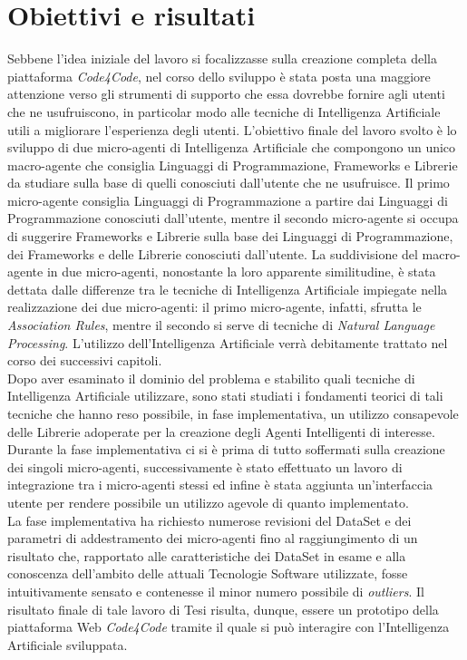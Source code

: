 \section{Obiettivi e risultati}
Sebbene l'idea iniziale del lavoro si focalizzasse sulla creazione completa della piattaforma \emph{Code4Code}, nel corso dello sviluppo è stata posta una maggiore attenzione verso gli strumenti di supporto che essa dovrebbe fornire agli utenti che ne usufruiscono, in particolar modo alle tecniche di Intelligenza Artificiale utili a migliorare l'esperienza degli utenti. L'obiettivo finale del lavoro svolto è lo sviluppo di due micro-agenti di Intelligenza Artificiale che compongono un unico macro-agente che consiglia Linguaggi di Programmazione, Frameworks e Librerie da studiare sulla base di quelli conosciuti dall'utente che ne usufruisce. Il primo micro-agente consiglia Linguaggi di Programmazione a partire dai Linguaggi di Programmazione conosciuti dall'utente, mentre il secondo micro-agente si occupa di suggerire Frameworks e Librerie sulla base dei Linguaggi di Programmazione, dei Frameworks e delle Librerie conosciuti dall'utente. La suddivisione del macro-agente in due micro-agenti, nonostante la loro apparente similitudine, è stata dettata dalle differenze tra le tecniche di Intelligenza Artificiale impiegate nella realizzazione dei due micro-agenti: il primo micro-agente, infatti, sfrutta le \emph{Association Rules}, mentre il secondo si serve di tecniche di \emph{Natural Language Processing}. L'utilizzo dell'Intelligenza Artificiale verrà debitamente trattato nel corso dei successivi capitoli.\\Dopo aver esaminato il dominio del problema e stabilito quali tecniche di Intelligenza Artificiale utilizzare, sono stati studiati i fondamenti teorici di tali tecniche che hanno reso possibile, in fase implementativa, un utilizzo consapevole delle Librerie adoperate per la creazione degli Agenti Intelligenti di interesse. Durante la fase implementativa ci si è prima di tutto soffermati sulla creazione dei singoli micro-agenti, successivamente è stato effettuato un lavoro di integrazione tra i micro-agenti stessi ed infine è stata aggiunta un'interfaccia utente per rendere possibile un utilizzo agevole di quanto implementato.\\La fase implementativa ha richiesto numerose revisioni del DataSet e dei parametri di addestramento dei micro-agenti fino al raggiungimento di un risultato che, rapportato alle caratteristiche dei DataSet in esame e alla conoscenza dell'ambito delle attuali Tecnologie Software utilizzate, fosse intuitivamente sensato e contenesse il minor numero possibile di \emph{outliers}. Il risultato finale di tale lavoro di Tesi risulta, dunque, essere un prototipo della piattaforma Web \emph{Code4Code} tramite il quale si può interagire con l'Intelligenza Artificiale sviluppata.  
